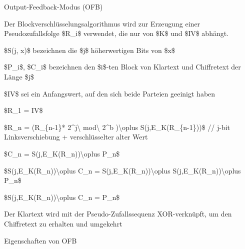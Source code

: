 \documentclass[a4paper]{article}
\begin{document}
\begin{multicols}{3}
      Output-Feedback-Modus (OFB)

      \begin{itemize*}
            \item
            Der Blockverschlüsselungsalgorithmus wird zur Erzeugung einer
            Pseudozufallsfolge \$R\_i\$ verwendet, die nur von \$K\$ und \$IV\$
            abhängt.

            \begin{itemize*}
                  \item \$S(j, x)\$ bezeichnen die \$j\$ höherwertigen Bits von \$x\$
                  \item \$P\_i\$, \$C\_i\$ bezeichnen den \$i\$-ten Block von Klartext und Chiffretext der Länge \$j\$
                  \item \$IV\$ sei ein Anfangswert, auf den sich beide Parteien geeinigt haben
                  \item \$R\_1 = IV\$
                  \item \$R\_n = (R\_\{n-1\}* 2\^{}j\textbackslash{} mod\textbackslash{} 2\^{}b )\textbackslash oplus S(j,E\_K(R\_\{n-1\}))\$ // j-bit Linksverschiebung + verschlüsselter alter Wert
                  \item \$C\_n = S(j,E\_K(R\_n))\textbackslash oplus P\_n\$
                  \item \$S(j,E\_K(R\_n))\textbackslash oplus C\_n = S(j,E\_K(R\_n))\textbackslash oplus S(j,E\_K(R\_n))\textbackslash oplus P\_n\$
                  \item \$S(j,E\_K(R\_n))\textbackslash oplus C\_n = P\_n\$
            \end{itemize*}
            \item
            Der Klartext wird mit der Pseudo-Zufallssequenz XOR-verknüpft, um den
            Chiffretext zu erhalten und umgekehrt
            \item
            Eigenschaften von OFB


\end{itemize*}
\end{multicols}
\end{document}
